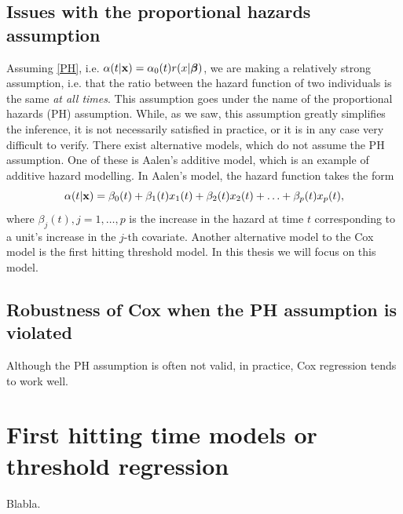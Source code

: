 

\subsection{Issues with the proportional hazards assumption}
Assuming \eqref{PH}, i.e. $\alpha(t|\mathbf{x})=\alpha_0(t)r(x|\boldsymbol{\beta})$, we are making a relatively strong assumption, i.e. that the ratio between the hazard function of two individuals is the same \textit{at all times}. This assumption goes under the name of the proportional hazards (PH) assumption. While, as we saw, this assumption greatly simplifies the inference, it is not necessarily satisfied in practice, or it is in any case very difficult to verify. There exist alternative models, which do not assume the PH assumption. One of these is Aalen's additive model, which is an example of additive hazard modelling. In Aalen's model, the hazard function takes the form
\begin{equation}
    \alpha(t|\mathbf{x})=\beta_0(t)+\beta_1(t)x_1(t)+\beta_2(t)x_2(t)+\ldots+\beta_p(t)x_p(t),
\end{equation}
where $\beta_j(t),j=1,\ldots,p$ is the increase in the hazard at time $t$ corresponding to a unit's increase in the $j$-th covariate. Another alternative model to the Cox model is the first hitting threshold model. In this thesis we will focus on this model.

\subsection{Robustness of Cox when the PH assumption is violated}
Although the PH assumption is often not valid, in practice, Cox regression tends to work well. 

\section{First hitting time models or threshold regression}\label{sec:FHT}
Blabla.

